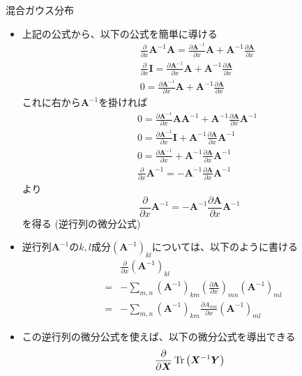 \documentclass[dvipdfmx,notheorems,t]{beamer}
\begin{document}
\begin{frame}{混合ガウス分布}
\begin{itemize}
\begin{itemize}
		\item 上記の公式から、以下の公式を簡単に導ける
		\begin{eqnarray}
			&& \frac{\partial}{\partial x} \bm{A}^{-1} \bm{A} = \frac{\partial \bm{A}^{-1}}{\partial x} \bm{A} + \bm{A}^{-1} \frac{\partial \bm{A}}{\partial x} \nonumber \\
			&& \frac{\partial}{\partial x} \bm{I} = \frac{\partial \bm{A}^{-1}}{\partial x} \bm{A} + \bm{A}^{-1} \frac{\partial \bm{A}}{\partial x} \nonumber \\
			&& 0 = \frac{\partial \bm{A}^{-1}}{\partial x} \bm{A} + \bm{A}^{-1} \frac{\partial \bm{A}}{\partial x}
		\end{eqnarray}
		これに右から$\bm{A}^{-1}$を掛ければ
		\begin{eqnarray}
			&& 0 = \frac{\partial \bm{A}^{-1}}{\partial x} \bm{A} \bm{A}^{-1} + \bm{A}^{-1} \frac{\partial \bm{A}}{\partial x} \bm{A}^{-1} \nonumber \\
			&& 0 = \frac{\partial \bm{A}^{-1}}{\partial x} \bm{I} + \bm{A}^{-1} \frac{\partial \bm{A}}{\partial x} \bm{A}^{-1} \nonumber \\
			&& 0 = \frac{\partial \bm{A}^{-1}}{\partial x} + \bm{A}^{-1} \frac{\partial \bm{A}}{\partial x} \bm{A}^{-1} \nonumber \\
			&& \frac{\partial}{\partial x} \bm{A}^{-1} = - \bm{A}^{-1} \frac{\partial \bm{A}}{\partial x} \bm{A}^{-1}
		\end{eqnarray}
		より
		\begin{equation}
			\frac{\partial}{\partial x} \bm{A}^{-1} = - \bm{A}^{-1} \frac{\partial \bm{A}}{\partial x} \bm{A}^{-1}
		\end{equation}
		を得る (逆行列の微分公式)
		\newline
		
		\item 逆行列$\bm{A}^{-1}$の$k, l$成分$\left( \bm{A}^{-1} \right)_{kl}$については、以下のように書ける
		\begin{eqnarray}
			&& \frac{\partial}{\partial x} \left( \bm{A}^{-1} \right)_{kl} \nonumber \\
			&=& - \sum_{m, n} \left( \bm{A}^{-1} \right)_{km} \left( \frac{\partial \bm{A}}{\partial x} \right)_{mn} \left( \bm{A}^{-1} \right)_{ml} \nonumber \\
			&=& - \sum_{m, n} \left( \bm{A}^{-1} \right)_{km} \frac{\partial A_{mn}}{\partial x} \left( \bm{A}^{-1} \right)_{ml}
		\end{eqnarray}
		
		\item この逆行列の微分公式を使えば、以下の微分公式を導出できる
		\begin{equation}
			\frac{\partial}{\partial \bm{X}} \operatorname{Tr} \left( \bm{X}^{-1} \bm{Y} \right) \nonumber
		\end{equation}
		

\end{itemize}
\end{itemize}
\end{frame}
\end{document}
